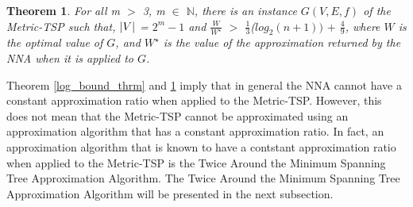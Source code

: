 \documentclass{article}
\newtheorem{theorem}[definition]{Theorem}
\begin{document}
\begin{theorem}
\label{no_proof}
For all m $>$ 3, m $\in$ $\mathbb{N}$, there is an instance $G(V,E,f)$ of the Metric-TSP such that, $\abs{V}$ = $2^m - 1$ and $\frac{W}{W^\star}$ $>$ $\frac{1}{3}$($log_2 (n+1))$ $+$ $\frac{4}{9}$, where $W$ is the optimal value of $G$, and $W^\star$ is the value of the approximation returned by the NNA when it is applied to $G$.{}
\end{theorem}
Theorem \ref{log_bound_thrm} and \ref{no_proof} imply that in general the NNA cannot have a constant approximation ratio when applied to the Metric-TSP. However, this does not mean that the Metric-TSP cannot be approximated using an approximation algorithm that has a constant approximation ratio. In fact, an approximation algorithm that is known to have a contstant approximation ratio when applied to the Metric-TSP is the Twice Around the Minimum Spanning Tree Approximation Algorithm. The Twice Around the Minimum Spanning Tree Approximation Algorithm will be presented in the next subsection.    
\end{document}
